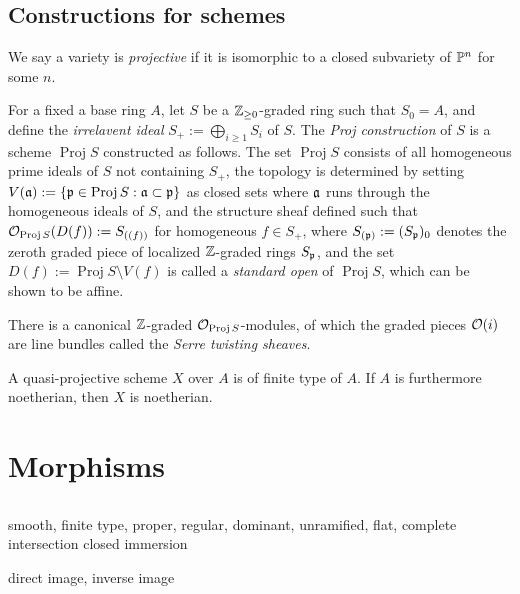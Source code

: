 \documentclass{../../large}
\newcommand{\Proj}{\operatorname{Proj}}
\begin{document}
\begin{prb}
\end{prb}


\section{Constructions for schemes}



\begin{prb}
We say a variety is \emph{projective} if it is isomorphic to a closed subvariety of $\P^n$ for some $n$.

For a fixed a base ring $A$, let $S$ be a $\Z_{\ge0}$-graded ring such that $S_0=A$, and define the \emph{irrelavent ideal} $S_+:=\bigoplus_{i\ge1}S_i$ of $S$.
The \emph{Proj construction} of $S$ is a scheme $\Proj S$ constructed as follows.
The set $\Proj S$ consists of all homogeneous prime ideals of $S$ not containing $S_+$, the topology is determined by setting $V(\fa):=\{\fp\in\Proj S:\fa\subset\fp\}$ as closed sets where $\fa$ runs through the homogeneous ideals of $S$, and the structure sheaf defined such that $\cO_{\Proj S}(D(f)):=S_{((f))}$ for homogeneous $f\in S_+$, where $S_{(\fp)}:=(S_\fp)_0$ denotes the zeroth graded piece of localized $\Z$-graded rings $S_\fp$, and the set $D(f):=\Proj S\setminus V(f)$ is called a \emph{standard open} of $\Proj S$, which can be shown to be affine.

There is a canonical $\Z$-graded $\cO_{\Proj S}$-modules, of which the graded pieces $\cO(i)$ are line bundles called the \emph{Serre twisting sheaves}.
\end{prb}

A quasi-projective scheme $X$ over $A$ is of finite type of $A$.
If $A$ is furthermore noetherian, then $X$ is noetherian.





\chapter{Morphisms}

\section{}
smooth, finite type, proper, regular, dominant, unramified, flat, complete intersection
closed immersion


direct image, inverse image
\end{document}
